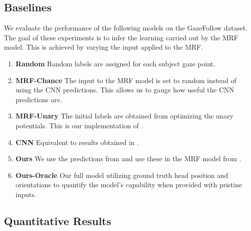 \documentclass[10pt,twocolumn,letterpaper]{article}
\begin{document}
\subsection{Baselines}

We evaluate the performance of the following models on the GazeFollow \cite{nips15_recasens} dataset. The goal of these experiments is to infer the learning carried out by the MRF model. This is achieved by varying the input applied to the MRF.
\begin{enumerate}[wide, labelwidth=!, labelindent=0pt, itemsep=0em]
  \item \textbf{Random} Random labels are assigned for each subject gaze point.
  \item \textbf{MRF-Chance} The input to the MRF model is set to random instead of using the CNN predictions. This allows us to gauge how useful the CNN predictions are.
  \item \textbf{MRF-Unary} The initial labels are obtained from optimizing the unary potentials. This is our implementation of \cite{fathi2012social}.
  \item \textbf{CNN} Equivalent to results obtained in \cite{nips15_recasens}.
  \item \textbf{Ours} We use the predictions from \cite{nips15_recasens} and use these in the MRF model from \cite{fathi2012social}.
  \item \textbf{Ours-Oracle} Our full model utilizing ground truth head position and orientations to quantify the model’s capability when provided with pristine inputs.
\end{enumerate}

\subsection{Quantitative Results}
\end{document}
